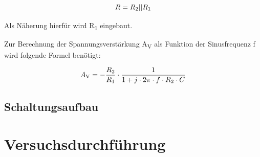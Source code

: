 \begin{equation}
    R = R\textsubscript{2}|| R\textsubscript{1}
    \label{eq:R}
\end{equation}

Als Näherung hierfür wird R\textsubscript{1} eingebaut.

Zur Berechnung der Spannungsverstärkung A\textsubscript{V} als
Funktion der Sinusfrequenz f wird folgende Formel benötigt:

\begin{equation}
    A\textsubscript{V} = -\frac{R\textsubscript{2}}{R\textsubscript{1}} \cdot \frac{1}{1 + j \cdot 2 \pi \cdot f \cdot R\textsubscript{2} \cdot C}
    \label{eq:AV}
\end{equation}

\subsection*{Schaltungsaufbau}

\section*{Versuchsdurchführung}